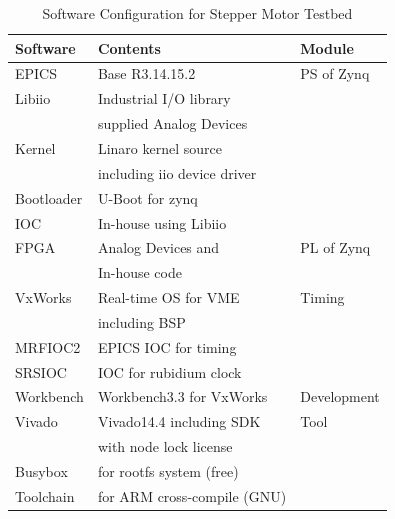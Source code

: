 \documentclass[a4paper,
              ]{jacow}
\begin{document}
\begin{table}[h!t]
	\setlength\tabcolsep{3.8pt}
	\caption{Software Configuration for Stepper Motor Testbed}
	\label{sw-conf}

	\begin{tabular}{@{}lll@{}}
		        
        \toprule
        \textbf{Software} & \textbf{Contents}                 & \textbf{Module}     \\
        \midrule
         EPICS        & Base R3.14.15.2                       & PS of Zynq            \\
         Libiio       & Industrial I/O library                &                       \\
                      & supplied Analog Devices               &                       \\         
         Kernel       & Linaro kernel source                  &                       \\
                      & including iio device driver           &                       \\         
         Bootloader   & U-Boot for zynq                       &                       \\
         IOC          & In-house using Libiio                 &                       \\

        \midrule
         FPGA         & Analog Devices and                    & PL of Zynq            \\
                      & In-house code                         &                       \\

        \midrule
         VxWorks      & Real-time OS for VME                  & Timing                \\
                      & including BSP                         &                       \\         
         MRFIOC2      & EPICS IOC for timing                  &                       \\

        \midrule
         SRSIOC       & IOC for rubidium clock                &                       \\

        \midrule
         Workbench    & Workbench3.3 for VxWorks              & Development           \\
         Vivado       & Vivado14.4 including SDK              & Tool                  \\        
                      & with node lock license                &                       \\            
         Busybox      & for rootfs system (free)              &                       \\
         Toolchain    & for ARM cross-compile (GNU)           &                       \\        
        \bottomrule    
        
    \end{tabular}
\end{table}
\end{document}
